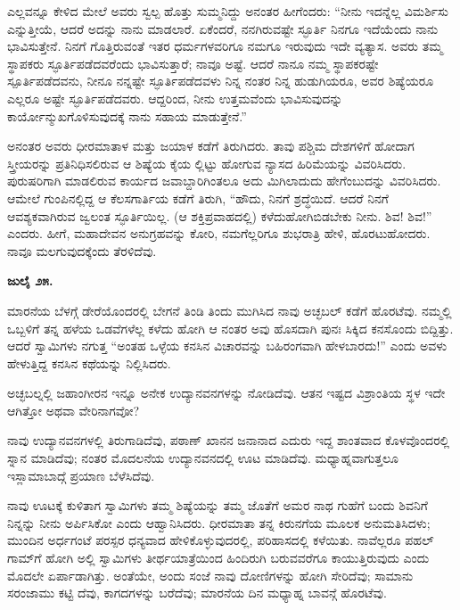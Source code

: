 ಎಲ್ಲವನ್ನೂ ಕೇಳಿದ ಮೇಲೆ ಅವರು ಸ್ವಲ್ಪ ಹೊತ್ತು ಸುಮ್ಮನಿದ್ದು ಅನಂತರ ಹೀಗೆಂದರು: “ನೀನು ಇದನ್ನೆಲ್ಲ ವಿಮರ್ಶಿಸು ಎನ್ನುತ್ತೀಯೆ, ಆದರೆ ಅದನ್ನು ನಾನು ಮಾಡಲಾರೆ. ಏಕೆಂದರೆ, ನನಗಿರುವಷ್ಟೇ ಸ್ಫೂರ್ತಿ ನಿನಗೂ ಇದೆಯೆಂದು ನಾನು ಭಾವಿಸುತ್ತೇನೆ. ನಿನಗೆ ಗೊತ್ತಿರುವಂತೆ ಇತರ ಧರ್ಮಗಳವರಿಗೂ ನಮಗೂ ಇರುವುದು ಇದೇ ವ್ಯತ್ಯಾಸ. ಅವರು ತಮ್ಮ ಸ್ಥಾಪಕರು ಸ್ಫೂರ್ತಿಪಡೆದವರೆಂದು ಭಾವಿಸುತ್ತಾರೆ; ನಾವೂ ಅಷ್ಟೆ. ಆದರೆ ನಾನೂ ನಮ್ಮ ಸ್ಥಾಪಕರಷ್ಟೇ ಸ್ಪೂರ್ತಿಪಡೆದವನು, ನೀನೂ ನನ್ನಷ್ಟೇ ಸ್ಫೂರ್ತಿಪಡೆದವಳು ನಿನ್ನ ನಂತರ ನಿನ್ನ ಹುಡುಗಿಯರೂ, ಅವರ ಶಿಷ್ಯೆಯರೂ ಎಲ್ಲರೂ ಅಷ್ಟೇ ಸ್ಫೂರ್ತಿಪಡೆದವರು. ಆದ್ದರಿಂದ, ನೀನು ಉತ್ತಮವೆಂದು ಭಾವಿಸುವುದನ್ನು ಕಾರ್ಯೋನ್ಮುಖಗೊಳಿಸುವುದಕ್ಕೆ ನಾನು ಸಹಾಯ ಮಾಡುತ್ತೇನೆ.”

ಅನಂತರ ಅವರು ಧೀರಮಾತಾಳ ಮತ್ತು ಜಯಾಳ ಕಡೆಗೆ ತಿರುಗಿದರು. ತಾವು ಪಶ್ಚಿಮ ದೇಶಗಳಿಗೆ ಹೋದಾಗ ಸ್ತ್ರೀಯರನ್ನು ಪ್ರತಿನಿಧಿಸಲಿರುವ ಆ ಶಿಷ್ಯೆಯ ಕೈಯ ಲ್ಲಿಟ್ಟು ಹೋಗುವ ನ್ಯಾಸದ ಹಿರಿಮೆಯನ್ನು ವಿವರಿಸಿದರು. ಪುರುಷರಿಗಾಗಿ ಮಾಡಲಿರುವ ಕಾರ್ಯದ ಜವಾಬ್ದಾರಿಗಿಂತಲೂ ಅದು ಮಿಗಿಲಾದುದು ಹೇಗೆಂಬುದನ್ನು ವಿವರಿಸಿದರು. ಆಮೇಲೆ ಗುಂಪಿನಲ್ಲಿದ್ದ ಆ ಕೆಲಸಗಾರ್ತಿಯ ಕಡೆಗೆ ತಿರುಗಿ, “ಹೌದು, ನಿನಗೆ ಶ್ರದ್ಧೆಯಿದೆ. ಆದರೆ ನಿನಗೆ ಆವಶ್ಯಕವಾಗಿರುವ ಜ್ವಲಂತ ಸ್ಫೂರ್ತಿಯಿಲ್ಲ. (ಆ ಶಕ್ತಿಪ್ರವಾಹದಲ್ಲಿ) ಕಳೆದುಹೋಗಿಬಿಡಬೇಕು ನೀನು. ಶಿವ! ಶಿವ!” ಎಂದರು. ಹೀಗೆ, ಮಹಾದೇವನ ಅನುಗ್ರಹವನ್ನು ಕೋರಿ, ನಮಗೆಲ್ಲರಿಗೂ ಶುಭರಾತ್ರಿ ಹೇಳಿ, ಹೊರಟುಹೋದರು. ನಾವೂ ಮಲಗುವುದಕ್ಕೆಂದು ತೆರಳಿದೆವು.

\textbf{ಜುಲೈ ೨೫.}

ಮಾರನೆಯ ಬೆಳಗ್ಗೆ ಡೇರೆಯೊಂದರಲ್ಲಿ ಬೇಗನೆ ತಿಂಡಿ ತಿಂದು ಮುಗಿಸಿದ ನಾವು ಅಚ್ಛಬಲ್ ಕಡೆಗೆ ಹೊರಟೆವು. ನಮ್ಮಲ್ಲಿ ಒಬ್ಬಳಿಗೆ ತನ್ನ ಹಳೆಯ ಒಡವೆಗಳೆಲ್ಲ ಕಳೆದು ಹೋಗಿ ಆ ನಂತರ ಅವು ಹೊಸದಾಗಿ ಪುನಃ ಸಿಕ್ಕಿದ ಕನಸೊಂದು ಬಿದ್ದಿತ್ತು. ಆದರೆ ಸ್ವಾಮಿಗಳು ನಗುತ್ತ “ಅಂತಹ ಒಳ್ಳೆಯ ಕನಸಿನ ವಿಚಾರವನ್ನು ಬಹಿರಂಗವಾಗಿ ಹೇಳಬಾರದು!” ಎಂದು ಅವಳು ಹೇಳುತ್ತಿದ್ದ ಕನಸಿನ ಕಥೆಯನ್ನು ನಿಲ್ಲಿಸಿದರು.

ಅಚ್ಛಬಲ್ನಲ್ಲಿ ಜಹಾಂಗೀರನ ಇನ್ನೂ ಅನೇಕ ಉದ್ಯಾನವನಗಳನ್ನು ನೋಡಿದೆವು. ಆತನ ಇಷ್ಟದ ವಿಶ್ರಾಂತಿಯ ಸ್ಥಳ ಇದೇ ಆಗಿತ್ತೋ ಅಥವಾ ವೇರಿನಾಗವೋ?

ನಾವು ಉದ್ಯಾನವನಗಳಲ್ಲಿ ತಿರುಗಾಡಿದೆವು, ಪಠಾಣ್ ಖಾನನ ಜನಾನಾದ ಎದುರು ಇದ್ದ ಶಾಂತವಾದ ಕೊಳವೊಂದರಲ್ಲಿ ಸ್ನಾನ ಮಾಡಿದೆವು; ನಂತರ ಮೊದಲನೆಯ ಉದ್ಯಾನವನದಲ್ಲಿ ಊಟ ಮಾಡಿದೆವು. ಮಧ್ಯಾಹ್ನವಾಗುತ್ತಲೂ ಇಸ್ಲಾಮಾಬಾದ್ಗೆ ಪ್ರಯಾಣ ಬೆಳೆಸಿದೆವು.

ನಾವು ಊಟಕ್ಕೆ ಕುಳಿತಾಗ ಸ್ವಾಮಿಗಳು ತಮ್ಮ ಶಿಷ್ಯೆಯನ್ನು ತಮ್ಮ ಜೊತೆಗೆ ಅಮರ ನಾಥ ಗುಹೆಗೆ ಬಂದು ಶಿವನಿಗೆ ನಿನ್ನನ್ನು ನೀನು ಅರ್ಪಿಸಿಕೋ ಎಂದು ಆಹ್ವಾನಿಸಿದರು. ಧೀರಮಾತಾ ತನ್ನ ಕಿರುನಗೆಯ ಮೂಲಕ ಅನುಮತಿಸಿದಳು; ಮುಂದಿನ ಅರ್ಧಗಂಟೆ ಪರಸ್ಪರ ಧನ್ಯವಾದ ಹೇಳಿಕೊಳ್ಳುವುದರಲ್ಲಿ, ಪರಿಹಾಸದಲ್ಲಿ ಕಳೆಯಿತು. ನಾವೆಲ್ಲರೂ ಪಹಲ್ ಗಾಮ್​ಗೆ ಹೋಗಿ ಅಲ್ಲಿ ಸ್ವಾಮಿಗಳು ತೀರ್ಥಯಾತ್ರೆಯಿಂದ ಹಿಂದಿರುಗಿ ಬರುವವರೆಗೂ ಕಾಯುತ್ತಿರುವುದು ಎಂದು ಮೊದಲೇ ಏರ್ಪಾಡಾಗಿತ್ತು. ಅಂತೆಯೇ, ಅಂದು ಸಂಜೆ ನಾವು ದೋಣಿಗಳನ್ನು ಹೋಗಿ ಸೇರಿದೆವು; ಸಾಮಾನು ಸರಂಜಾಮು ಕಟ್ಟಿ ದೆವು, ಕಾಗದಗಳನ್ನು ಬರೆದೆವು; ಮಾರನೆಯ ದಿನ ಮಧ್ಯಾಹ್ನ ಬಾವನ್ಗೆ ಹೊರಟೆವು.

